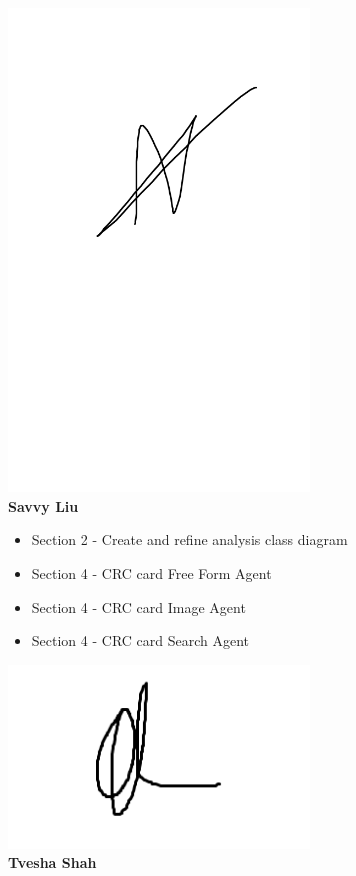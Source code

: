 \documentclass[]{article}
\begin{document}
\includegraphics[width=0.6\textwidth]{Nehad.png}
\\
\textbf{Savvy Liu}
\begin{itemize}
    \setlength\itemindent{2em}
    \item Section 2 - Create and refine analysis class diagram
    \item Section 4 - CRC card Free Form Agent
    \item Section 4 - CRC card Image Agent
    \item Section 4 - CRC card Search Agent
\end{itemize} 
\includegraphics[width=0.6\textwidth]{Savvy.png}
\\
\textbf{Tvesha Shah}
\end{document}
